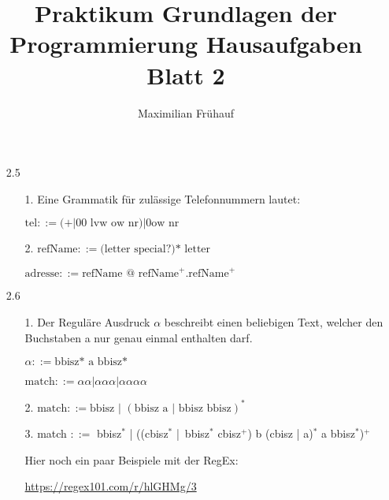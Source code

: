 \documentclass[a4paper, 10pt]{article}
\title{Praktikum Grundlagen der Programmierung Hausaufgaben Blatt 2}
\author{Maximilian Frühauf}
\begin{document}
\maketitle

\begin{enumerate}
	\item[2.5]
	      \begin{enumerate}
		      \item[1.] Eine Grammatik für zulässige Telefonnummern lautet:

		            \( \text{tel} ::= (+ | 00 \text{ lvw ow nr}) | 0 \text{ow nr}\)
		      \item[2.] \( \text{refName} ::= \text{(letter special?)* letter } \)

				\( \text{adresse} ::= \text{refName @ refName}^+ . \text{refName}^+ \)
	      \end{enumerate}
	\item[2.6]
	      \begin{enumerate}
		      \item[1.] Der Reguläre Ausdruck \( \alpha \) beschreibt einen beliebigen Text, welcher den Buchstaben
		            a nur genau einmal enthalten darf.

		            \( \alpha ::= \text{bbisz* a bbisz*} \)

		            \( \text{match} ::=  \alpha\alpha | \alpha\alpha\alpha | \alpha\alpha\alpha\alpha \)
		      \item[2.] \( \text{match} ::= \text{bbisz | } (\text{bbisz a | bbisz bbisz})^* \)
		      \item[3.]
		            match \( ::=  \) bbisz\( ^* \) |
		            ((cbisz\( ^* \) | bbisz\( ^* \) cbisz\( ^+ \)) b (cbisz | a)\( ^* \) a bbisz\( ^* \))\( ^+ \)

		            \vspace{10pt}
		            Hier noch ein paar Beispiele mit der RegEx:

		            \url{https://regex101.com/r/hlGHMg/3}
	      \end{enumerate}
\end{enumerate}
\end{document}
